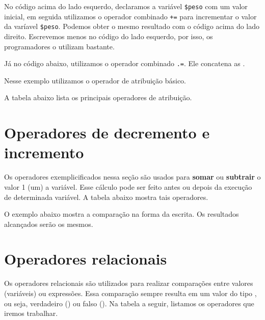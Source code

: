 No código acima do lado esquerdo, declaramos a variável \texttt{\$peso} com um valor inicial,
em seguida utilizamos o operador combinado \texttt{+=} para incrementar o valor da
varíavel \texttt{\$peso}. Podemos obter o mesmo resultado com o código acima do lado direito.
Escrevemos menos no código do lado esquerdo, por isso, os programadores o utilizam bastante.

Já no código abaixo, utilizamos o operador combinado \texttt{.=}. Ele concatena as \tipostrings.



Nesse exemplo utilizamos o operador de atribuição básico.



A tabela abaixo lista os principais operadores de atribuição. 



\section{Operadores de decremento e incremento}
\label{operadores-de-decremento-e-incremento}

Os operadores exemplicificados nessa seção são usados para \textbf{somar} ou \textbf{subtrair}
o valor 1 (um) a variável. Esse cálculo pode ser feito antes ou depois da execução de 
determinada variável. A tabela abaixo mostra tais operadores.



O exemplo abaixo mostra a comparação na forma da escrita. Os resultados alcançados serão
os mesmos.



\section{Operadores relacionais}
\label{operadores-relacionais}

Os operadores relacionais são utilizados para realizar comparações entre valores (variáveis)
ou expressões. Essa comparação sempre resulta em um valor do tipo \booleano, ou seja,
verdadeiro (\true) ou falso (\false). Na tabela a seguir, listamos os operadores
que iremos trabalhar.

